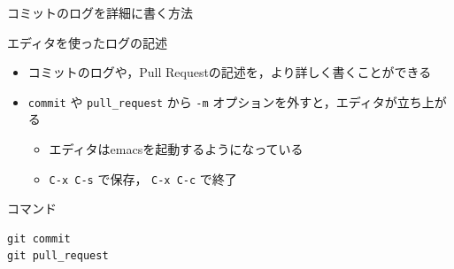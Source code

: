 \documentclass[t, aspectratio=169]{beamer}
\begin{document}
\begin{frame}[fragile,label=sec-2-3-7]{コミットのログを詳細に書く方法}
 \begin{block}{エディタを使ったログの記述}
\begin{itemize}
\item コミットのログや，Pull Requestの記述を，より詳しく書くことができる
\item \texttt{commit} や \texttt{pull\_request} から  \texttt{-m} オプションを外すと，エディタが立ち上がる
\begin{itemize}
\item エディタはemacsを起動するようになっている
\item \texttt{C-x C-s} で保存， \texttt{C-x C-c} で終了
\end{itemize}
\end{itemize}
\end{block}
\begin{block}{コマンド}
\begin{verbatim}
git commit
git pull_request
\end{verbatim}
\end{block}
\end{frame}
\end{document}
